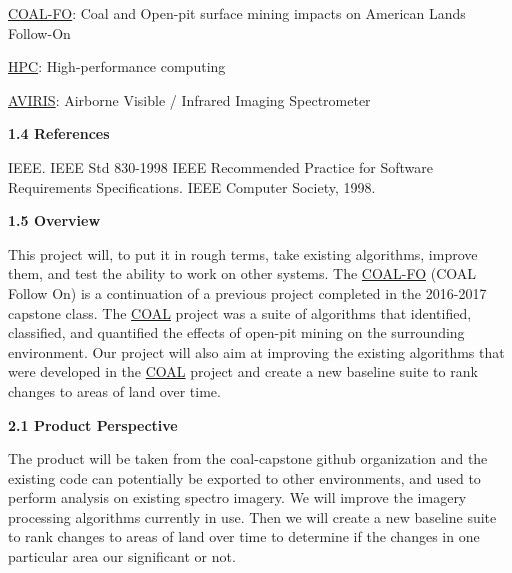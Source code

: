 \documentclass[a4paper,12pt]{article}
\begin{document}
\noindent \href{http://eecs.oregonstate.edu/capstone/submission/?page=preview\&pid=320}{COAL-FO}: Coal and Open-pit surface mining impacts on American Lands Follow-On\newline


\noindent \href{https://en.wikipedia.org/wiki/Supercomputer}{HPC}: High-performance computing\newline

\noindent \href{https://aviris.jpl.nasa.gov/}{AVIRIS}: Airborne Visible / Infrared Imaging Spectrometer\newline

\noindent \textbf{1.4 References}\newline

IEEE. IEEE Std 830-1998 IEEE Recommended Practice for Software Requirements Specifications. IEEE Computer Society, 1998.\newline


\noindent \textbf{1.5 Overview}\newline


\noindent This project will, to put it in rough terms, take existing algorithms, improve them, and test the ability to work on other systems. The \href{http://eecs.oregonstate.edu/capstone/submission/?page=preview\&pid=320}{COAL-FO} (COAL Follow On) is a continuation of a previous project completed in the 2016-2017 capstone class. The \href{https://capstone-coal.github.io/}{COAL} project was a suite of algorithms that identified, classified, and quantified the effects of open-pit mining on the surrounding environment. Our project will also aim at improving the existing algorithms that were developed in the \href{https://capstone-coal.github.io/}{COAL} project and create a new baseline suite to rank changes to areas of land over time. \newline


\newline


\noindent \textbf{2.1 Product Perspective}\newline


\noindent The product will be taken from the coal-capstone github organization and the existing code can potentially be exported to other environments, and used to perform analysis on existing spectro imagery. We will improve the imagery processing algorithms currently in use. Then we will create a new baseline suite to rank changes to areas of land over time to determine if the changes in one particular area our significant or not.\newline
\end{document}
